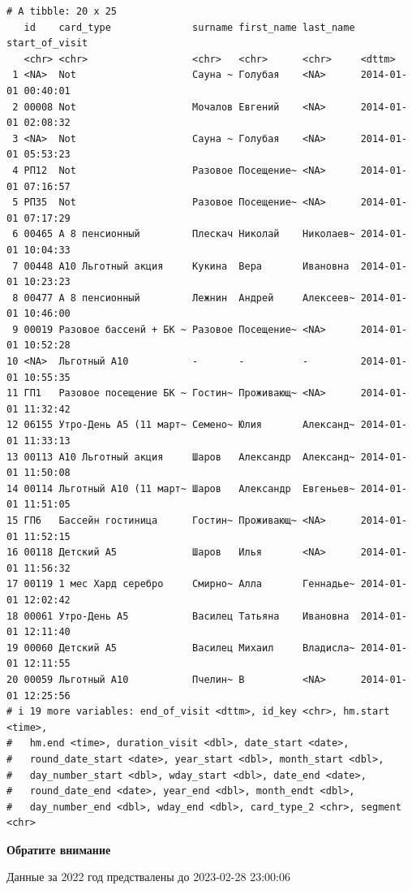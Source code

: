 \documentclass[
  letterpaper,
  DIV=11,
  numbers=noendperiod]{scrartcl}
\begin{document}
\begin{verbatim}
# A tibble: 20 x 25
   id    сard_type              surname first_name last_name start_of_visit     
   <chr> <chr>                  <chr>   <chr>      <chr>     <dttm>             
 1 <NA>  Not                    Сауна ~ Голубая    <NA>      2014-01-01 00:40:01
 2 00008 Not                    Мочалов Евгений    <NA>      2014-01-01 02:08:32
 3 <NA>  Not                    Сауна ~ Голубая    <NA>      2014-01-01 05:53:23
 4 РП12  Not                    Разовое Посещение~ <NA>      2014-01-01 07:16:57
 5 РП35  Not                    Разовое Посещение~ <NA>      2014-01-01 07:17:29
 6 00465 А 8 пенсионный         Плескач Николай    Николаев~ 2014-01-01 10:04:33
 7 00448 А10 Льготный акция     Кукина  Вера       Ивановна  2014-01-01 10:23:23
 8 00477 А 8 пенсионный         Лежнин  Андрей     Алексеев~ 2014-01-01 10:46:00
 9 00019 Разовое бассенй + БК ~ Разовое Посещение~ <NA>      2014-01-01 10:52:28
10 <NA>  Льготный А10           -       -          -         2014-01-01 10:55:35
11 ГП1   Разовое посещение БК ~ Гостин~ Проживающ~ <NA>      2014-01-01 11:32:42
12 06155 Утро-День А5 (11 март~ Семено~ Юлия       Александ~ 2014-01-01 11:33:13
13 00113 А10 Льготный акция     Шаров   Александр  Александ~ 2014-01-01 11:50:08
14 00114 Льготный А10 (11 март~ Шаров   Александр  Евгеньев~ 2014-01-01 11:51:05
15 ГП6   Бассейн гостиница      Гостин~ Проживающ~ <NA>      2014-01-01 11:52:15
16 00118 Детский А5             Шаров   Илья       <NA>      2014-01-01 11:56:32
17 00119 1 мес Хард серебро     Смирно~ Алла       Геннадье~ 2014-01-01 12:02:42
18 00061 Утро-День А5           Василец Татьяна    Ивановна  2014-01-01 12:11:40
19 00060 Детский А5             Василец Михаил     Владисла~ 2014-01-01 12:11:55
20 00059 Льготный А10           Пчелин~ В          <NA>      2014-01-01 12:25:56
# i 19 more variables: end_of_visit <dttm>, id_key <chr>, hm.start <time>,
#   hm.end <time>, duration_visit <dbl>, date_start <date>,
#   round_date_start <date>, year_start <dbl>, month_start <dbl>,
#   day_number_start <dbl>, wday_start <dbl>, date_end <date>,
#   round_date_end <date>, year_end <dbl>, month_endt <dbl>,
#   day_number_end <dbl>, wday_end <dbl>, сard_type_2 <chr>, segment <chr>
\end{verbatim}

\begin{tcolorbox}[enhanced jigsaw, left=2mm, bottomrule=.15mm, opacityback=0, arc=.35mm, colframe=quarto-callout-important-color-frame, rightrule=.15mm, colback=white, toprule=.15mm, breakable, leftrule=.75mm]
\begin{minipage}[t]{5.5mm}
\textcolor{quarto-callout-important-color}{\faExclamation}
\end{minipage}%
\begin{minipage}[t]{\textwidth - 5.5mm}

\textbf{Обратите внимание}\vspace{2mm}

Данные за 2022 год предствалены до 2023-02-28 23:00:06

\end{minipage}%
\end{tcolorbox}
\end{document}
